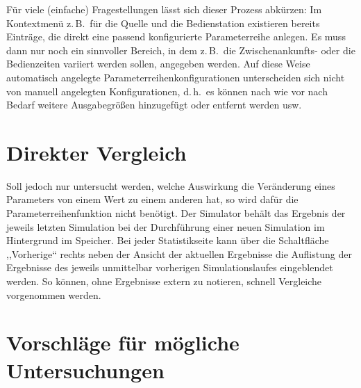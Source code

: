 \documentclass[deutsch]{svmono}
\begin{document}
Für viele (einfache) Fragestellungen lässt sich dieser Prozess abkürzen: Im Kontextmenü z.\,B.\ für die Quelle und die Bedienstation existieren bereits Einträge, die direkt eine passend konfigurierte Parameterreihe anlegen. Es muss dann nur noch ein sinnvoller Bereich, in dem z.\,B.\ die Zwischenankunfts- oder die Bedienzeiten variiert werden sollen, angegeben werden. Auf diese Weise automatisch angelegte Parameterreihenkonfigurationen unterscheiden sich nicht von manuell angelegten Konfigurationen, d.\,h.\ es können nach wie vor nach Bedarf weitere Ausgabegrößen hinzugefügt oder entfernt werden usw.



\section{Direkter Vergleich}

Soll jedoch nur untersucht werden, welche Auswirkung die Veränderung eines Parameters von einem Wert zu einem anderen hat, so wird dafür die Parameterreihenfunktion nicht benötigt. Der Simulator behält das Ergebnis der jeweils letzten Simulation bei der Durchführung einer neuen Simulation im Hintergrund im Speicher. Bei jeder Statistikseite kann über die Schaltfläche ,,Vorherige`` rechts neben der Ansicht der aktuellen Ergebnisse die Auflistung der Ergebnisse des jeweils unmittelbar vorherigen Simulationslaufes eingeblendet werden. So können, ohne Ergebnisse extern zu notieren, schnell Vergleiche vorgenommen werden.



\section{Vorschläge für mögliche Untersuchungen}
\end{document}
